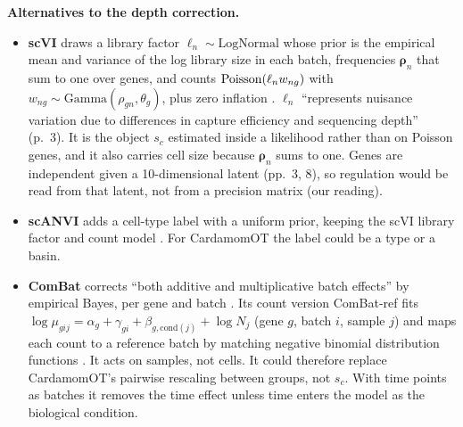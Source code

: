 \documentclass[11pt,a4paper]{article}
\begin{document}
\textbf{Alternatives to the depth correction.}
\begin{itemize}
  \item \textbf{scVI} draws a library factor $\ell_n\sim\mathrm{LogNormal}$ whose prior is the empirical mean and
        variance of the log library size in each batch, frequencies $\bm\rho_n$ that sum to one over genes, and
        counts $\operatorname{Poisson}(\ell_nw_{ng})$ with $w_{ng}\sim\mathrm{Gamma}(\rho_{gn},\theta_g)$, plus zero inflation
        \parencite[author manuscript, pp.~8--9]{lopezDeepGenerativeModeling2018}. $\ell_n$ \enquote{represents nuisance variation due to differences in capture
        efficiency and sequencing depth} (p.~3). It is the object $s_c$ estimated inside a likelihood rather than
        on Poisson genes, and it also carries cell size because $\bm\rho_n$ sums to one. Genes are independent
        given a 10-dimensional latent (pp.~3, 8), so regulation would be read from that latent, not from a
        precision matrix (our reading).
  \item \textbf{scANVI} adds a cell-type label with a uniform prior, keeping the scVI library factor and count
        model \parencite[eqs~1--8, p.~15]{xuProbabilisticHarmonizationAnnotation2021}.
        For CardamomOT the label could be a type or a basin.
  \item \textbf{ComBat} corrects \enquote{both additive and multiplicative batch effects} by empirical Bayes,
        per gene and batch \parencite{johnsonAdjustingBatchEffects2007}. Its count
        version ComBat-ref fits $\log\mu_{gij}=\alpha_g+\gamma_{gi}+\beta_{g,\mathrm{cond}(j)}+\log N_j$ (gene $g$, batch $i$, sample $j$) and maps each count to a
        reference batch by matching negative binomial distribution functions
        \parencite[p.~2]{zhangHighlyEffectiveBatch2025}.
        It acts on samples, not cells. It could therefore replace CardamomOT's pairwise rescaling between groups,
        not $s_c$. With time points as batches it removes the time effect unless time enters the model as the
        biological condition.
\end{itemize}
\end{document}

